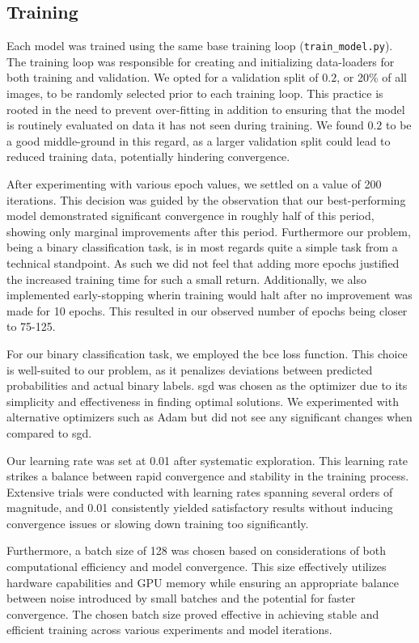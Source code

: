 \documentclass{article}
\begin{document}
\subsection{Training}

Each model was trained using the same base training loop (\texttt{train\_model.py}). The training loop was responsible for creating and initializing data-loaders for both training and validation. We opted for a validation split of $0.2$, or 20\% of all images, to be randomly selected prior to each training loop. This practice is rooted in the need to prevent over-fitting in addition to ensuring that the model is routinely evaluated on data it has not seen during training. We found $0.2$ to be a good middle-ground in this regard, as a larger validation split could lead to reduced training data, potentially hindering convergence.

After experimenting with various epoch values, we settled on a value of 200 iterations. This decision was guided by  the observation that our best-performing model demonstrated significant convergence in roughly half of this period, showing only marginal improvements after this period. Furthermore our problem, being a binary classification task, is in most regards quite a simple task from a technical standpoint. As such we did not feel that adding more epochs justified the increased training time for such a small return. Additionally, we also implemented early-stopping wherin training would halt after no improvement was made for 10 epochs. This resulted in our observed number of epochs being closer to 75-125.

For our binary classification task, we employed the \gls{bce} loss function. This choice is well-suited to our problem, as it penalizes deviations between predicted probabilities and actual binary labels. \gls{sgd} was chosen as the optimizer due to its simplicity and effectiveness in finding optimal solutions. We experimented with alternative optimizers such as Adam but did not see any 
significant changes when compared to \gls{sgd}.

Our learning rate was set at 0.01 after systematic exploration. This learning rate strikes a balance between rapid convergence and stability in the training process. Extensive trials were conducted with learning rates spanning several orders of magnitude, and 0.01 consistently yielded satisfactory results without inducing convergence issues or slowing down training too significantly.

Furthermore, a batch size of 128 was chosen based on considerations of both computational efficiency and model convergence. This size effectively utilizes hardware capabilities and GPU memory while ensuring an appropriate balance between noise introduced by small batches and the potential for faster convergence. The chosen batch size proved effective in achieving stable and efficient training across various experiments and model iterations.
\end{document}
